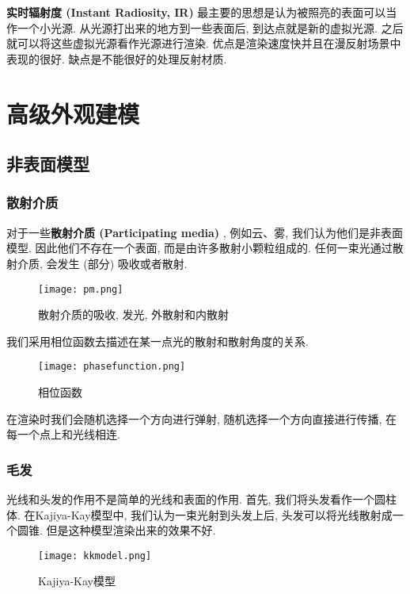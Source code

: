 \textbf{实时辐射度 (Instant Radiosity, IR) }最主要的思想是认为被照亮的表面可以当作一个小光源. 从光源打出来的地方到一些表面后, 到达点就是新的虚拟光源. 之后就可以将这些虚拟光源看作光源进行渲染. 优点是渲染速度快并且在漫反射场景中表现的很好. 缺点是不能很好的处理反射材质. 

\section{高级外观建模}

\subsection{非表面模型}

\subsubsection{散射介质}

对于一些\textbf{散射介质 (Participating media) }, 例如云、雾, 我们认为他们是非表面模型. 因此他们不存在一个表面, 而是由许多散射小颗粒组成的. 任何一束光通过散射介质, 会发生 (部分) 吸收或者散射. 

\begin{figure}[H]
	\centering
	\texttt{[image: pm.png]}
	\caption{散射介质的吸收, 发光, 外散射和内散射}
	\label{fig:pm}
\end{figure}

我们采用相位函数去描述在某一点光的散射和散射角度的关系. 

\begin{figure}[H]
	\centering
	\texttt{[image: phasefunction.png]}
	\caption{相位函数}
	\label{fig:pf}
\end{figure}

在渲染时我们会随机选择一个方向进行弹射, 随机选择一个方向直接进行传播, 在每一个点上和光线相连. 

\subsubsection{毛发}

光线和头发的作用不是简单的光线和表面的作用. 首先, 我们将头发看作一个圆柱体. 在Kajiya-Kay模型中, 我们认为一束光射到头发上后, 头发可以将光线散射成一个圆锥. 但是这种模型渲染出来的效果不好. 

\begin{figure}[H]
	\centering
	\texttt{[image: kkmodel.png]}
	\caption{Kajiya-Kay模型}
	\label{fig:kk}
\end{figure}

